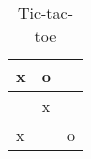 \begin{table}[htbp]
\centering
\begin{tabular}{|l|l|l|}
\hline
x & o &   \\ \hline
  & x &   \\ \hline
x &   & o \\ \hline
\end{tabular}
\caption{Tic-tac-toe}
\label{tab:table_Maksim}
\end{table}